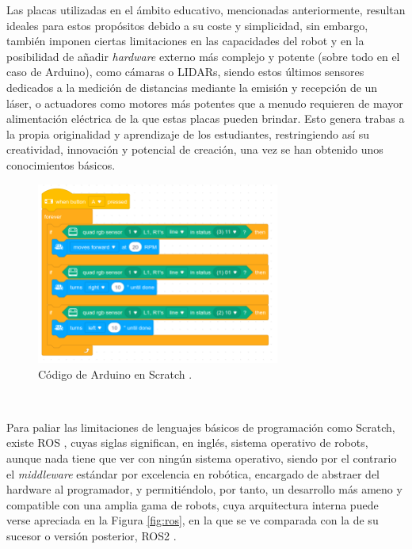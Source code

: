 Las placas utilizadas en el ámbito educativo, mencionadas anteriormente,
resultan ideales para estos propósitos debido a su coste y simplicidad, sin
embargo, también imponen ciertas limitaciones en las capacidades del robot y en
la posibilidad de añadir \textit{hardware} externo más complejo y potente (sobre
todo en el caso de Arduino), como cámaras o LIDARs, siendo estos últimos
sensores dedicados a la medición de distancias mediante la emisión y recepción
de un láser, o actuadores como motores más potentes que a menudo requieren de
mayor alimentación eléctrica de la que estas placas pueden brindar.
Esto genera trabas a la propia originalidad y aprendizaje de los estudiantes,
restringiendo así su creatividad, innovación y potencial de creación, una vez se
han obtenido unos conocimientos básicos.

\begin{figure} [h!]
  \begin{center}
    \includegraphics[width=8cm]{figs/scratch_arduino_code}
  \end{center}
  \caption{Código de Arduino en Scratch \cite{arduino_scratch_code}.}
  \label{fig:scratch}
\end{figure}\

Para paliar las limitaciones de lenguajes básicos de programación como Scratch,
existe ROS \cite{ros}, cuyas siglas significan, en inglés, sistema operativo
de robots, aunque nada tiene que ver con ningún sistema operativo, siendo por el
contrario el \textit{middleware} estándar por excelencia en robótica, encargado
de abstraer del hardware al programador, y permitiéndolo, por tanto, un
desarrollo más ameno y compatible con una amplia gama de robots, cuya
arquitectura interna puede verse apreciada en la Figura \ref{fig:ros}, en la que
se ve comparada con la de su sucesor o versión posterior, ROS2 \cite{ros2}.
\\

